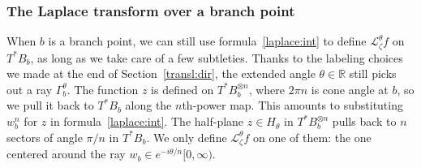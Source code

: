 \documentclass{article}
\theoremstyle{definition}
\newcommand{\maps}{\colon}
\newcommand{\R}{\mathbb{R}}
\newcommand{\C}{\mathbb{C}}
\newcommand{\laplace}{\mathcal{L}}
\newcommand{\borel}{\mathcal{B}}
\begin{document}
\subsubsection{The Laplace transform over a branch point}
When $b$ is a branch point, we can still use formula~\eqref{laplace:int} to define $\laplace_\zeta^\theta f$ on $T^*B_b$, as long as we take care of a few subtleties. Thanks to the labeling choices we made at the end of Section~\ref{transl:dir}, the extended angle $\theta \in \R$ still picks out a ray $\Gamma_b^\theta$. The function $z$ is defined on $T^*B_b^{\otimes n}$, where $2\pi n$ is cone angle at $b$, so we pull it back to $T^*B_b$ along the $n$th-power map. This amounts to substituting $w_b^n$ for $z$ in formula~\eqref{laplace:int}. The half-plane $z \in H_{\theta}$ in $T^*B_b^{\otimes n}$ pulls back to $n$ sectors of angle $\pi/n$ in $T^*B_b$. We only define $\laplace_\zeta^\theta f$ on one of them: the one centered around the ray $w_b \in e^{-i\theta/n}[0, \infty)$.
\end{document}
